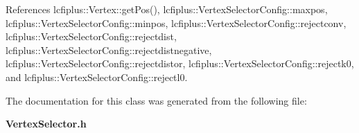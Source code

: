References lcfiplus\-::\-Vertex\-::get\-Pos(), lcfiplus\-::\-Vertex\-Selector\-Config\-::maxpos, lcfiplus\-::\-Vertex\-Selector\-Config\-::minpos, lcfiplus\-::\-Vertex\-Selector\-Config\-::rejectconv, lcfiplus\-::\-Vertex\-Selector\-Config\-::rejectdist, lcfiplus\-::\-Vertex\-Selector\-Config\-::rejectdistnegative, lcfiplus\-::\-Vertex\-Selector\-Config\-::rejectdistor, lcfiplus\-::\-Vertex\-Selector\-Config\-::rejectk0, and lcfiplus\-::\-Vertex\-Selector\-Config\-::rejectl0.



The documentation for this class was generated from the following file\-:\begin{DoxyCompactItemize}
\item 
{\bf Vertex\-Selector.\-h}\end{DoxyCompactItemize}
